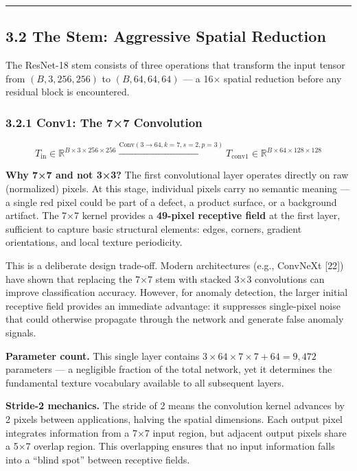 \begin{center}\rule{0.5\linewidth}{0.5pt}\end{center}

\subsection{3.2 The Stem: Aggressive Spatial Reduction}\label{the-stem-aggressive-spatial-reduction}

The ResNet-18 stem consists of three operations that transform the input tensor from \((B, 3, 256, 256)\) to \((B, 64, 64, 64)\) --- a 16× spatial reduction before any residual block is encountered.

\subsubsection{3.2.1 Conv1: The 7×7 Convolution}\label{conv1-the-77-convolution}

\[T_{\text{in}} \in \mathbb{R}^{B \times 3 \times 256 \times 256} \xrightarrow{\text{Conv}(3 \to 64, k{=}7, s{=}2, p{=}3)} T_{\text{conv1}} \in \mathbb{R}^{B \times 64 \times 128 \times 128}\]

\textbf{Why 7×7 and not 3×3?} The first convolutional layer operates directly on raw (normalized) pixels. At this stage, individual pixels carry no semantic meaning --- a single red pixel could be part of a defect, a product surface, or a background artifact. The 7×7 kernel provides a \textbf{49-pixel receptive field} at the first layer, sufficient to capture basic structural elements: edges, corners, gradient orientations, and local texture periodicity.

This is a deliberate design trade-off. Modern architectures (e.g., ConvNeXt {[}22{]}) have shown that replacing the 7×7 stem with stacked 3×3 convolutions can improve classification accuracy. However, for anomaly detection, the larger initial receptive field provides an immediate advantage: it suppresses single-pixel noise that could otherwise propagate through the network and generate false anomaly signals.

\textbf{Parameter count.} This single layer contains \(3 \times 64 \times 7 \times 7 + 64 = 9{,}472\) parameters --- a negligible fraction of the total network, yet it determines the fundamental texture vocabulary available to all subsequent layers.

\textbf{Stride-2 mechanics.} The stride of 2 means the convolution kernel advances by 2 pixels between applications, halving the spatial dimensions. Each output pixel integrates information from a 7×7 input region, but adjacent output pixels share a 5×7 overlap region. This overlapping ensures that no input information falls into a ``blind spot'' between receptive fields.

